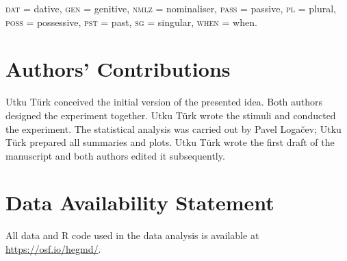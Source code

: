 \documentclass[]{interact}\usepackage[]{graphicx}\usepackage[]{color}
\theoremstyle{plain}%
\theoremstyle{definition}
\theoremstyle{remark}
\begin{document}
\textsc{dat} = dative, \textsc{gen} = genitive, \textsc{nmlz} = nominaliser, \textsc{pass} = passive, \textsc{pl} = plural, \textsc{poss} = possessive, \textsc{pst} = past, \textsc{sg} = singular, \textsc{when} = when. %


\section*{Authors' Contributions} %


Utku T\"urk conceived the initial version of the presented idea. Both authors designed the experiment together. 
Utku T\"urk wrote the stimuli and conducted the experiment. The statistical analysis was carried out by Pavel Loga\v{c}ev; Utku T\"urk prepared all summaries and plots. Utku T\"urk wrote the first draft of the manuscript and both authors edited it subsequently. 

\section*{Data Availability Statement} %

All data and R code used in the data analysis is available at \url{https://osf.io/hegmd/}.





\end{document}
